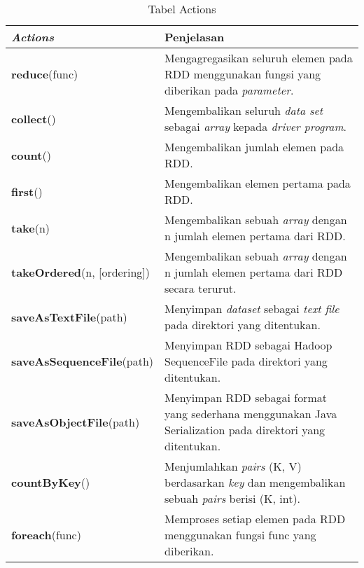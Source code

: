 \begin{table}[H] 
	\centering 
	\caption{Tabel Actions}
	\label{tab:actions}
	\begin{tabular}{p{6cm}p{9cm}}
		\toprule[1.5pt]
\hline
		 \textbf{\textit{Actions}} & Penjelasan \\
\hline
\midrule

\hline
\textbf{reduce}(func) & Mengagregasikan seluruh elemen pada RDD menggunakan fungsi yang diberikan pada \textit{parameter}. \\

\hline
\textbf{collect}() & Mengembalikan seluruh \textit{data set} sebagai \textit{array} kepada \textit{driver program}. \\

\hline
\textbf{count}() & Mengembalikan jumlah elemen pada RDD. \\

\hline
\textbf{first}() & Mengembalikan elemen pertama pada RDD. \\

\hline
\textbf{take}(n) & Mengembalikan sebuah \textit{array} dengan n jumlah elemen pertama dari RDD.\\

\hline
\textbf{takeOrdered}(n, [ordering]) & Mengembalikan sebuah \textit{array} dengan n jumlah elemen pertama dari RDD secara terurut. \\

\hline
\textbf{saveAsTextFile}(path) & Menyimpan \textit{dataset} sebagai \textit{text file} pada direktori yang ditentukan. \\

\hline
\textbf{saveAsSequenceFile}(path) & Menyimpan RDD sebagai Hadoop SequenceFile pada direktori yang ditentukan.\\

\hline
\textbf{saveAsObjectFile}(path) & Menyimpan RDD sebagai format yang sederhana menggunakan Java Serialization pada direktori yang ditentukan.\\

\hline
\textbf{countByKey}() & Menjumlahkan \textit{pairs} (K, V) berdasarkan \textit{key} dan mengembalikan sebuah \textit{pairs} berisi (K, int). \\

\hline
\textbf{foreach}(func) & Memproses setiap elemen pada RDD menggunakan fungsi func yang diberikan. \\

\hline


\bottomrule
	\end{tabular} 
\end{table}



